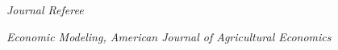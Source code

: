 \documentclass[10pt]{article}
\renewcommand{\section}[2]%
        {\pagebreak[3]\vspace{1.3\baselineskip}%
         \phantomsection\addcontentsline{toc}{section}{#1}%
         \hspace{0in}%
         \marginpar{
         \raggedright \scshape #1}#2}
\newcommand{\halfblankline}{\quad\vspace{-0.5\baselineskip}\pagebreak[3]}
\begin{document}
\textit{Journal Referee}

\textit{Economic Modeling, American Journal of Agricultural Economics} 

\halfblankline
















\end{document}
